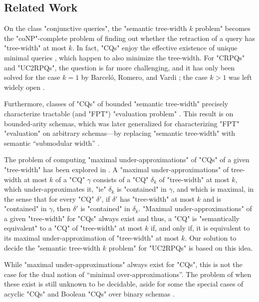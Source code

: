 \subsection{\AP{}Related Work}
\label{sec:relwork}
On the class "conjunctive queries", the "semantic tree-width $k$ problem" becomes the "coNP"-complete problem of finding out whether the retraction of a query has "tree-width"
at most $k$. In fact, "CQs" enjoy the effective existence of unique minimal queries \cite[Theorem 12]{ChandraMerlin1977Implementation}, which happen to also minimize the tree-width. For "CRPQs" and "UC2RPQs", the question is far more challenging, and it has only been solved for the case $k = 1$ 
by Barceló, Romero, and Vardi \cite[Theorem 6.1]{BarceloRomeroVardi2016SemanticAcyclicity}; the case $k>1$ was left widely open
\cite[\S 7]{BarceloRomeroVardi2016SemanticAcyclicity}.

Furthermore, classes of "CQs" of bounded "semantic tree-width" precisely characterize tractable (and "FPT") "evaluation problem" \cite[Theorem~1.1]{Grohe2007ComplexityHomomorphism}.
This result is on bounded-arity schemas, which was later generalized \cite[Theorem~1]{ChenGottlobLanzingerPichler2020Semantic} for characterizing "FPT" "evaluation" on arbitrary schemas---by replacing "semantic tree-width" with semantic ``submodular width'' \cite{Marx13Tractable}.

The problem of computing "maximal under-approximations" of "CQs" of a given "tree-width" has been explored in \cite{BarceloLibkinRomero2014Efficient}.
A "maximal under-approximations" of tree-width at most $k$ of a "CQ" $\gamma$ consists of a
"CQ" $\delta_k$ of "tree-width" at most $k$, which under-approximates it,
"ie" $\delta_k$ is "contained" in $\gamma$, and which is maximal, in the sense that for every "CQ" 
$\delta'$, if $\delta'$ has "tree-width" at most $k$ and is "contained" in $\gamma$, then 
$\delta'$ is "contained" in $\delta_k$. 
"Maximal under-approximations" of a given "tree-width" for "CQs" always exist \cite{BarceloLibkinRomero2014Efficient} and thus, a "CQ" is "semantically equivalent"
to a "CQ" of "tree-width" at most $k$ if, and only if, it is equivalent to its maximal under-approximation of "tree-width" at most $k$. Our solution to decide the
"semantic tree-width $k$ problem" for "UC2RPQs" is based on this idea.

While "maximal under-approximations" always exist for "CQs", this is not the case for the dual notion of ``minimal over-approximations''. The problem of when these exist is still unknown to be decidable, aside for some the special cases of acyclic "CQs" and Boolean "CQs" over binary schemas \cite{BarceloRomeroZeume2020Approximation}.

